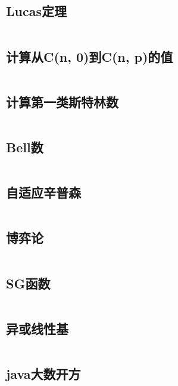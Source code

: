 \inputminted{cpp}{code/Cnmmodp.cc}

\subsection{Lucas定理} 

\inputminted{cpp}{code/lucas.cc}

\subsection{计算从C(n, 0)到C(n, p)的值} 

\inputminted{cpp}{code/nC0tonCp.cc}

\subsection{计算第一类斯特林数} 

\inputminted{cpp}{code/FirstStirling.cc}

\subsection{Bell数} 

\inputminted{cpp}{code/Bell数.cc}

\subsection{自适应辛普森} 

\inputminted{cpp}{code/AdaptiveSimpson.cc}

\subsection{博弈论} 

\inputminted{text}{code/game.txt}

\subsection{SG函数} 

\inputminted{cpp}{code/SG函数.cc}

\subsection{异或线性基} 

\inputminted{cpp}{code/LinearBasis.cc}

\subsection{java大数开方} 

